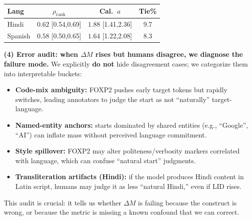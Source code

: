 \begin{itemize}[leftmargin=1.5em]
\begin{description}
\begin{center}
\footnotesize
\setlength{\tabcolsep}{2pt}
\begin{tabular}{lccc}
\toprule
Lang & $\rho_{\text{rank}}$ & Cal.\ $a$ & Tie\% \\
\midrule
Hindi   & $\mathbf{0.62}$ [0.54,0.69] & $\mathbf{1.88}$ [1.41,2.36] & 9.7 \\
Spanish & $\mathbf{0.58}$ [0.50,0.65] & $\mathbf{1.64}$ [1.22,2.08] & 8.3 \\
\bottomrule
\end{tabular}
\end{center}

\vspace{6pt}
\textbf{(4) Error audit: when $\Delta M$ rises but humans disagree, we diagnose the failure mode.}
We explicitly \textbf{do not} hide disagreement cases; we categorize them into interpretable buckets:
\begin{itemize}[leftmargin=*,itemsep=2pt]
\item \textbf{Code-mix ambiguity:} FOXP2 pushes early target tokens but rapidly switches, leading annotators to judge the start as not “naturally” target-language.
\item \textbf{Named-entity anchors:} starts dominated by shared entities (e.g., “Google”, “AI”) can inflate mass without perceived language commitment.
\item \textbf{Style spillover:} FOXP2 may alter politeness/verbosity markers correlated with language, which can confuse “natural start” judgments.
\item \textbf{Transliteration artifacts (Hindi):} if the model produces Hindi content in Latin script, humans may judge it as less “natural Hindi,” even if LID rises.
\end{itemize}
This audit is crucial: it tells us whether $\Delta M$ is failing because the construct is wrong, or because the metric is missing a known confound that we can correct.


\end{description}
\end{itemize}
